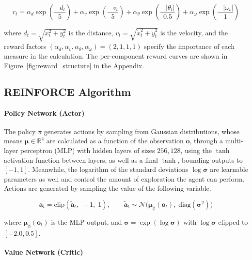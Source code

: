 \documentclass{article}
\begin{document}
\begin{equation}
    r_t = \alpha_d \exp\!\left(\frac{-d_t}{5}\right) + \alpha_v \exp\!\left(\frac{-v_t}{5}\right) + \alpha_\theta \exp\!\left(\frac{-|\theta_t|}{0.5}\right) + \alpha_\omega \exp\!\left(\frac{-|\omega_t|}{1}\right)
\end{equation}

where $d_t = \sqrt{x_t^2 + y_t^2}$ is the distance, $v_t = \sqrt{\dot{x}_t^2 + \dot{y}_t^2}$ is the velocity, and the reward factors $(\alpha_d, \alpha_v, \alpha_\theta, \alpha_\omega) = (2, 1, 1, 1)$ specify the importance of each measure in the calculation. The per-component reward curves are shown in Figure~\ref{fig:reward_structure} in the Appendix.


\subsection{REINFORCE Algorithm}

\paragraph{Policy Network (Actor)}

The policy $\pi$ generates actions by sampling from Gaussian distributions, whose means $\bm{\mu} \in \mathbb{R}^4$ are calculated as a function of the observation $\mathbf{o}$, through a multi-layer perceptron (MLP) with hidden layers of sizes $256, 128$, using the $\tanh$ activation function between layers, as well as a final $\tanh$, bounding outputs to $[-1, 1]$. Meanwhile, the logarithm of the standard deviations $\log \bm{\sigma}$ are learnable parameters as well and control the amount of exploration the agent can perform. Actions are generated by sampling the value of the following variable.

\begin{equation}
  \mathbf{a}_t = \text{clip}(\tilde{\mathbf{a}}_t,\; -1,\; 1), \qquad \tilde{\mathbf{a}}_t \sim \mathcal{N}\!\big(\bm{\mu}_\phi(\mathbf{o}_t),\; \text{diag}(\bm{\sigma}^2)\big)
  \label{eq:action_dist}
\end{equation}

where $\bm{\mu}_\phi(\mathbf{o}_t)$ is the MLP output, and $\bm{\sigma} = \exp(\log \bm{\sigma})$ with $\log \bm{\sigma}$ clipped to $[-2.0, 0.5]$.

\paragraph{Value Network (Critic)}
\end{document}
